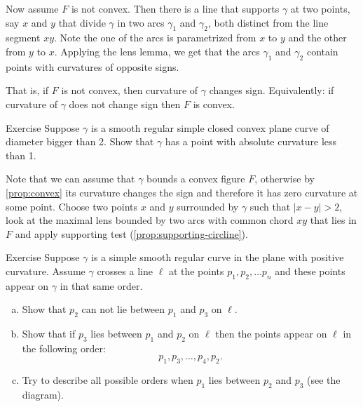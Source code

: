 Now assume $F$ is not convex.
Then there is a line that supports $\gamma$ at two points, say $x$ and $y$ that divide $\gamma$ in two arcs $\gamma_1$ and $\gamma_2$, both distinct from the line segment $xy$.
Note the one of the arcs is parametrized from $x$ to $y$ and the other from $y$ to $x$.
Applying the lens lemma, we get that the arcs $\gamma_1$ and $\gamma_2$ contain points with curvatures of opposite signs.

That is, if $F$ is not convex, then curvature of $\gamma$ changes sign.
Equivalently: if curvature of $\gamma$ does not change sign then $F$ is convex.
\qeds

\begin{thm}{Exercise}\label{ex:convex small}
Suppose $\gamma$ is a smooth regular simple closed convex plane curve of diameter bigger than 2.
Show that $\gamma$ has a point with absolute curvature less than 1.
\end{thm}

Note that we can assume that $\gamma$ bounds a convex figure $F$, otherwise by \ref{prop:convex} its curvature changes the sign and therefore it has zero curvature at some point.
Choose two points $x$ and $y$ surrounded by $\gamma$ such that $|x-y|>2$,
look at the maximal lens bounded by two arcs with common chord $xy$ that lies in $F$ and apply supporting test (\ref{prop:supporting-circline}).

\begin{thm}{Exercise}\label{ex:line-curve-intersections}
Suppose $\gamma$ is a simple smooth regular curve in the plane with positive curvature.
Assume $\gamma$ crosses a line $\ell$ at the points $p_1,p_2,\dots p_n$ and these points appear on $\gamma$ in that same order.
\begin{enumerate}[(a)]

\item\label{ex:line-curve-intersections:a} Show that $p_2$ can not lie between $p_1$ and $p_3$ on $\ell$.

\item\label{ex:line-curve-intersections:b} Show that if $p_3$ lies between $p_1$ and $p_2$ on $\ell$ then the points appear on $\ell$ in the following order:  
\[p_1,p_3,\dots,p_4 ,p_2.\]

\item Try to describe all possible orders when $p_1$ lies between $p_2$ and $p_3$ (see the diagram).

\end{enumerate}
\end{thm}

